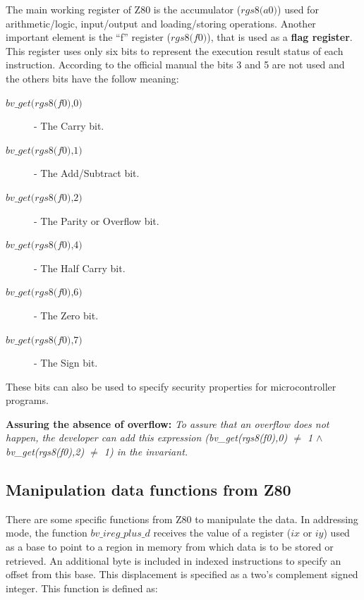 \documentclass[a4paper]{llncs}
\begin{document}
The main working register of Z80 is the accumulator ($\textit{rgs8(a0)}$) used for arithmetic/logic, input/output and loading/storing operations.
Another important element is the ``f'' register ($\textit{rgs8(f0)}$),  that is
used as a \textbf{flag register}. This register uses only six bits to represent the execution result status of each instruction.
According to the official manual the bits 3 and 5 are not used and the others bits have the follow meaning: %
\begin{description}
  \item[$\textit{bv\_get(rgs8(f0),0)}$] - The Carry bit.
  \item[$\textit{bv\_get(rgs8(f0),1)}$] - The Add/Subtract bit.
  \item[$\textit{bv\_get(rgs8(f0),2)}$] - The Parity or Overflow bit.
  \item[$\textit{bv\_get(rgs8(f0),4)}$] - The Half Carry bit.
  \item[$\textit{bv\_get(rgs8(f0),6)}$] - The Zero bit.
  \item[$\textit{bv\_get(rgs8(f0),7)}$] - The Sign bit.
\end{description}
These bits can also be used to specify security properties for microcontroller programs.   

\textbf{Assuring the absence of overflow:}
 \emph{To assure that an overflow does not happen, the developer can add this
 expression (\textit{bv\_get(rgs8(f0),0)} $\neq$ 1 $\land$
 \textit{bv\_get(rgs8(f0),2) $\neq$ 1}) in the invariant.
}

\subsection{Manipulation data functions from Z80}

 There are some specific functions from Z80 to manipulate the data. In addressing mode, the function
$\textit{bv\_ireg\_plus\_d}$ receives the value of a register ($\textit{ix}$ or $\textit{iy}$) 
used as a base to point to a region in memory from which data is to be stored or retrieved.
 An additional byte is included in indexed instructions to specify an offset from this base. This displacement is specified as a two's complement signed integer. This function is defined as:\\
\end{document}
